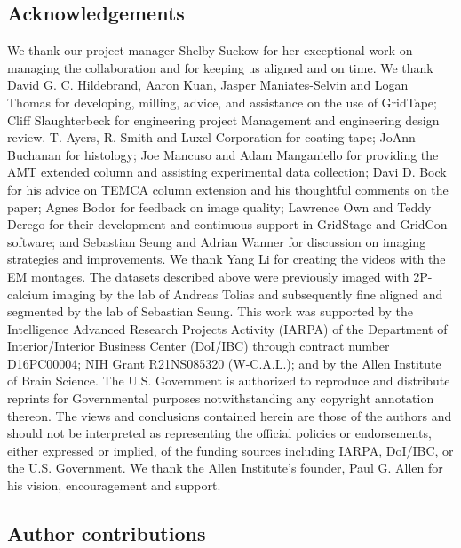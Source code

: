 \documentclass{article}
\begin{document}

\subsection*{Acknowledgements}

{\small We thank our project manager Shelby Suckow for her exceptional work on managing the collaboration and for keeping us aligned and on time. We thank David G. C. Hildebrand, Aaron Kuan, Jasper Maniates-Selvin and Logan Thomas for developing, milling, advice, and assistance on the use of GridTape; Cliff Slaughterbeck for engineering project Management and engineering design review. T. Ayers, R. Smith and Luxel Corporation for coating tape; JoAnn Buchanan for histology; Joe Mancuso and Adam Manganiello for providing the AMT extended column and assisting experimental data collection; Davi D. Bock for his advice on TEMCA column extension and his thoughtful comments on the paper; Agnes Bodor for feedback on image quality; Lawrence Own and Teddy Derego for their development and continuous support in GridStage and GridCon software; and Sebastian Seung and Adrian Wanner for discussion on imaging strategies and improvements. We thank Yang Li for creating the videos with the EM montages. The datasets described above were previously imaged with 2P-calcium imaging by the lab of Andreas Tolias and subsequently fine aligned and segmented by the lab of Sebastian Seung. This work was supported by the Intelligence Advanced Research Projects Activity (IARPA) of the Department of Interior/Interior Business Center (DoI/IBC) through contract number D16PC00004; NIH Grant R21NS085320 (W-C.A.L.); and by the Allen Institute of Brain Science. The U.S. Government is authorized to reproduce and distribute reprints for Governmental purposes notwithstanding any copyright annotation thereon. The views and conclusions contained herein are those of the authors and should not be interpreted as representing the official policies or endorsements, either expressed or implied, of the funding sources including IARPA, DoI/IBC, or the U.S. Government. We thank the Allen Institute’s founder, Paul G. Allen for his vision, encouragement and support.}

\subsection*{Author contributions}
\end{document}
